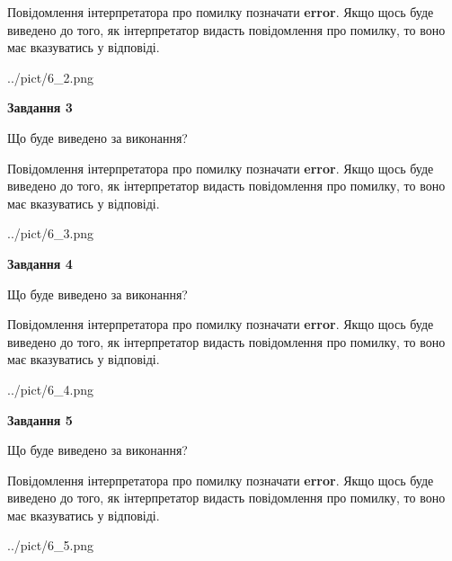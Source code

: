 \documentclass[12pt, ukrainian]{article}
\begin{document}
{\begin {large}
Повідомлення інтерпретатора про помилку позначати \textbf{error}.
Якщо щось буде виведено до того, як інтерпретатор видасть повідомлення про помилку, 
то воно має вказуватись у відповіді. \par


\begin{center}
	{../pict/6_2.png}
\end{center}
\newpage

{\begin {center}\textbf{Завдання 3}\end {center}}\par
Що буде виведено за виконання?

Повідомлення інтерпретатора про помилку позначати \textbf{error}.
Якщо щось буде виведено до того, як інтерпретатор видасть повідомлення про помилку, 
то воно має вказуватись у відповіді. \par


\begin{center}
	{../pict/6_3.png}
\end{center}
\newpage

{\begin {center}\textbf{Завдання 4}\end {center}}\par
Що буде виведено за виконання?

Повідомлення інтерпретатора про помилку позначати \textbf{error}.
Якщо щось буде виведено до того, як інтерпретатор видасть повідомлення про помилку, 
то воно має вказуватись у відповіді. \par


\begin{center}
	{../pict/6_4.png}
\end{center}
\newpage

{\begin {center}\textbf{Завдання 5}\end {center}}\par
Що буде виведено за виконання?

Повідомлення інтерпретатора про помилку позначати \textbf{error}.
Якщо щось буде виведено до того, як інтерпретатор видасть повідомлення про помилку, 
то воно має вказуватись у відповіді. \par


\begin{center}
	{../pict/6_5.png}
\end{center}
\newpage


\end{large}}
\end{document}
